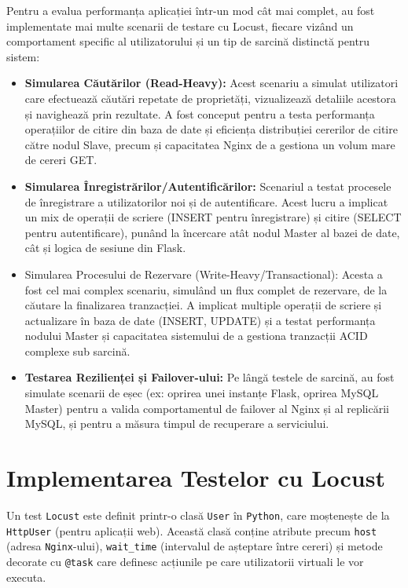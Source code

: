 \documentclass[12pt, a4paper, oneside, romanian]{teza-upb}
\begin{document}
Pentru a evalua performanța aplicației într-un mod cât mai complet, au fost implementate mai multe scenarii de testare cu Locust, fiecare vizând un comportament specific al utilizatorului și un tip de sarcină distinctă pentru sistem:
\begin{itemize}
	\item \textbf{Simularea Căutărilor (Read-Heavy):} Acest scenariu a simulat utilizatori care efectuează căutări repetate de proprietăți, vizualizează detaliile acestora și navighează prin rezultate. A fost conceput pentru a testa performanța operațiilor de citire din baza de date și eficiența distribuției cererilor de citire către nodul Slave, precum și capacitatea Nginx de a gestiona un volum mare de cereri GET.
	\item \textbf{Simularea Înregistrărilor/Autentificărilor:} Scenariul a testat procesele de înregistrare a utilizatorilor noi și de autentificare. Acest lucru a implicat un mix de operații de scriere (INSERT pentru înregistrare) și citire (SELECT pentru autentificare), punând la încercare atât nodul Master al bazei de date, cât și logica de sesiune din Flask.
	\item Simularea Procesului de Rezervare (Write-Heavy/Transactional): Acesta a fost cel mai complex scenariu, simulând un flux complet de rezervare, de la căutare la finalizarea tranzacției. A implicat multiple operații de scriere și actualizare în baza de date (INSERT, UPDATE) și a testat performanța nodului Master și capacitatea sistemului de a gestiona tranzacții ACID complexe sub sarcină.
	
	\item \textbf{Testarea Rezilienței și Failover-ului:} Pe lângă testele de sarcină, au fost simulate scenarii de eșec (ex: oprirea unei instanțe Flask, oprirea MySQL Master) pentru a valida comportamentul de failover al Nginx și al replicării MySQL, și pentru a măsura timpul de recuperare a serviciului.
	
\end{itemize}

\section{Implementarea Testelor cu Locust}
Un test \texttt{Locust} este definit printr-o clasă \texttt{User} în \texttt{Python}, care moștenește de la \texttt{HttpUser} (pentru aplicații web). Această clasă conține atribute precum \texttt{host} (adresa \texttt{Nginx}-ului), \texttt{wait\_time} (intervalul de așteptare între cereri) și metode decorate cu \texttt{@task} care definesc acțiunile pe care utilizatorii virtuali le vor executa.
\end{document}
